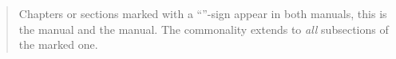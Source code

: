 

\ifhevea\relax\else{}\fi

\tableofcontents

\bigskip

\begin{quotation}
  \noindent Chapters or sections marked with a ``\commonpart''-sign appear in both manuals, this
  is the \App{} manual and the \OtherApp{} manual.  The commonality extends to \emph{all}
  subsections of the marked one.
\end{quotation}

\ifhevea
  \relax
\else
  \listoftables

  \listoffigures

  \cleardoublepage{}
\fi



\cleardoublepage{}


